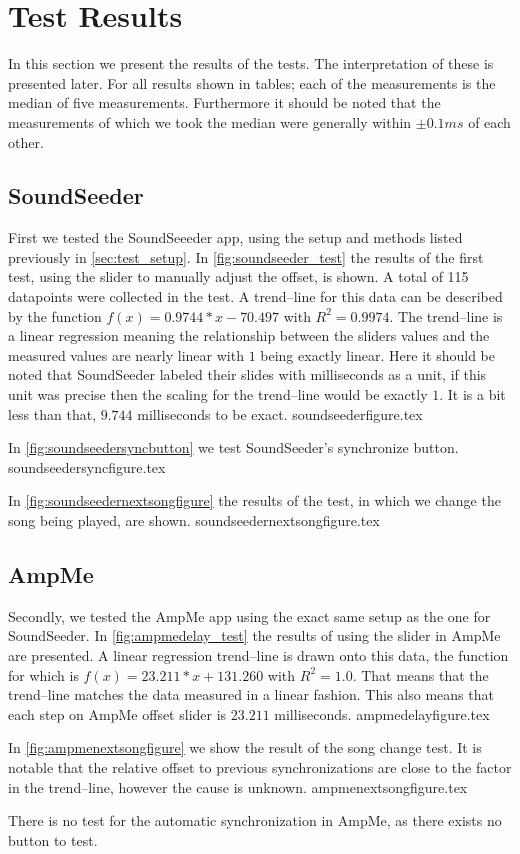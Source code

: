 \section{Test Results}
In this section we present the results of the tests.
The interpretation of these is presented later.
For all results shown in tables; each of the measurements is the median of five measurements. 
Furthermore it should be noted that the measurements of which we took the median were generally within $\pm 0.1 ms$ of each other. 

\subsection{SoundSeeder}
First we tested the SoundSeeeder app, using the setup and methods listed previously in \cref{sec:test_setup}.
In \vref{fig:soundseeder_test} the results of the first test, using the slider to manually adjust the offset, is shown. 
A total of 115 datapoints were collected in the test.
A trend--line for this data can be described by the function $f(x) = 0.9744 * x - 70.497$ with $R^2=0.9974$.
The trend--line is a linear regression meaning the relationship between the sliders values and the measured values are nearly linear with $1$ being exactly linear.
Here it should be noted that SoundSeeder labeled their slides with milliseconds as a unit, if this unit was precise then the scaling for the trend--line would be exactly $1$.
It is a bit less than that, $9.744$ milliseconds to be exact.
{soundseederfigure.tex}

In \vref{fig:soundseedersyncbutton} we test SoundSeeder's synchronize button.
{soundseedersyncfigure.tex}

In \vref{fig:soundseedernextsongfigure} the results of the test, in which we change the song being played, are shown. 
{soundseedernextsongfigure.tex}

\subsection{AmpMe}
Secondly, we tested the AmpMe app using the exact same setup as the one for SoundSeeder. 
In \vref{fig:ampmedelay_test} the results of using the slider in AmpMe are presented.
A linear regression trend--line is drawn onto this data, the function for which is $f(x) = 23.211 * x + 131.260$ with $R^2 = 1.0$.
That means that the trend--line matches the data measured in a linear fashion. 
This also means that each step on AmpMe offset slider is $23.211$ milliseconds. 
{ampmedelayfigure.tex}

In \vref{fig:ampmenextsongfigure} we show the result of the song change test. 
It is notable that the relative offset to previous synchronizations are close to the factor in the trend--line, however the cause is unknown. 
{ampmenextsongfigure.tex}

There is no test for the automatic synchronization in AmpMe, as there exists no button to test. 

